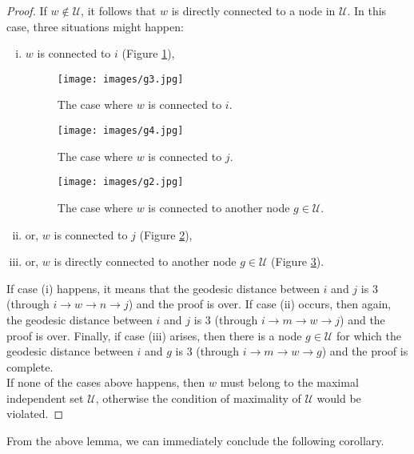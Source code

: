 \documentclass{article}
\begin{document}
\begin{proof}
	If $w \notin \mathcal{U}$, it follows that $w$ is directly connected to a node in $\mathcal{U}$. In this case, three situations might happen:
	\begin{enumerate}[(i)]
		\item $w$ is connected to $i$ (Figure \ref{fig:g3}),
		\begin{figure}[!ht]
			\begin{center}
				\texttt{[image: images/g3.jpg]}
				\caption{The case where $w$ is connected to $i$.}
				\label{fig:g3}
			\end{center}
		\end{figure}
		\begin{figure}[!ht]
			\begin{center}
				\texttt{[image: images/g4.jpg]}
				\caption{The case where $w$ is connected to $j$.}
				\label{fig:g4}
			\end{center}
		\end{figure}
		\begin{figure}[!ht]
			\begin{center}
				\texttt{[image: images/g2.jpg]}
				\caption{The case where $w$ is connected to another node $g \in \mathcal{U}$.}
				\label{fig:g2}
			\end{center}
		\end{figure}
		\item or, $w$ is connected to $j$ (Figure \ref{fig:g4}),
		\item or, $w$ is directly connected to another node $g \in \mathcal{U}$ (Figure \ref{fig:g2}).
	\end{enumerate}
	
	If case (i) happens, it means that the geodesic distance between $i$ and $j$ is $3$ (through $i \rightarrow w \rightarrow n \rightarrow j$) and the proof is over. If case (ii) occurs, then again, the geodesic distance between $i$ and $j$ is $3$ (through $i \rightarrow m \rightarrow w \rightarrow j$) and the proof is over. Finally, if case (iii) arises, then there is a node $g \in \mathcal{U}$ for which the geodesic distance between $i$ and $g$ is $3$ (through $i \rightarrow m \rightarrow w \rightarrow g$) and the proof is complete.\bigskip\\
	If none of the cases above happens, then $w$ must belong to the maximal independent set $\mathcal{U}$, otherwise the condition of maximality of $\mathcal{U}$ would be violated.
\end{proof}

From the above lemma, we can immediately conclude the following corollary.
\end{document}
